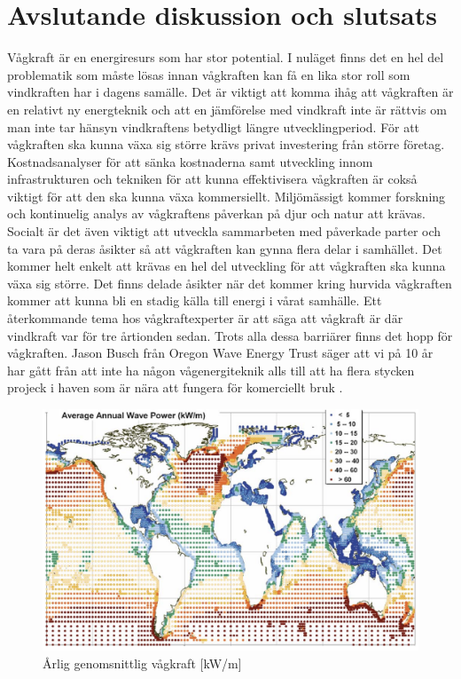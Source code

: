 \documentclass[10pt,a4paper,oneside]{article}
\begin{document}
\section{Avslutande diskussion och slutsats}
Vågkraft är en energiresurs som har stor potential. I nuläget finns det en hel del problematik som måste lösas innan vågkraften kan få en lika stor roll som vindkraften har i dagens samälle. 
Det är viktigt att komma ihåg att vågkraften är en relativt ny energteknik och att en jämförelse med vindkraft inte är rättvis om man inte tar hänsyn vindkraftens betydligt längre utvecklingperiod. För att vågkraften ska kunna växa sig större krävs privat investering från större företag. Kostnadsanalyser för att sänka kostnaderna samt utveckling innom infrastrukturen och tekniken för att kunna effektivisera vågkraften är cokså viktigt för att den ska kunna växa kommersiellt. Miljömässigt kommer forskning och kontinuelig analys av vågkraftens påverkan på djur och natur att krävas. Socialt är det även viktigt att utveckla sammarbeten med påverkade parter och ta vara på deras åsikter så att vågkraften kan gynna flera delar i samhället. Det kommer helt enkelt att krävas en hel del utveckling för att vågkraften ska kunna växa sig större. Det finns delade åsikter när det kommer kring hurvida vågkraften kommer att kunna bli en stadig källa till energi i vårat samhälle. Ett återkommande tema hos vågkraftexperter är att säga att vågkraft är där vindkraft var för tre årtionden sedan. Trots alla dessa barriärer finns det hopp för vågkraften. Jason Busch från Oregon Wave Energy Trust säger att vi på 10 år har gått från att inte ha någon vågenergiteknik alls till att ha flera stycken projeck i haven som är nära att fungera för komerciellt bruk \cite{IRENA}.
\newpage




\begin{figure}
\label{Globalmean}
	\includegraphics[scale=0.6]{globalmean.png}
	\caption{\r{A}rlig genomsnittlig v\r{a}gkraft [kW/m]}
\end{figure}
\end{document}
